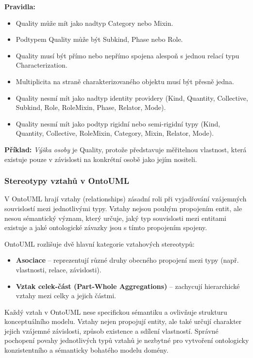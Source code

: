 \begin{itemize}
  \textbf{Pravidla:}
  \begin{itemize}
    \item Quality může mít jako nadtyp Category nebo Mixin.
    \item Podtypem Quality může být Subkind, Phase nebo Role.
    \item Quality musí být přímo nebo nepřímo spojena alespoň s jednou relací typu Characterization.
    \item Multiplicita na straně charakterizovaného objektu musí být přesně jedna.
    \item Quality nesmí mít jako nadtyp identity providery (Kind, Quantity, Collective, Subkind, Role, RoleMixin, Phase, Relator, Mode).
    \item Quality nesmí mít jako podtyp rigidní nebo semi-rigidní typy (Kind, Quantity, Collective, RoleMixin, Category, Mixin, Relator, Mode). \cite{ontouml_class_stereotypes}
  \end{itemize}

  \textbf{Příklad:} \textit{Výška osoby} je Quality, protože představuje měřitelnou vlastnost, která existuje pouze v závislosti na konkrétní osobě jako jejím nositeli.

\end{itemize}


\subsubsection{Stereotypy vztahů v OntoUML}
\label{sec:ontouml-vztahy}
V OntoUML hrají vztahy (relationships) zásadní roli při vyjadřování vzájemných souvislostí mezi jednotlivými typy. Vztahy nejsou pouhým propojením entit, ale nesou sémantický význam, který určuje, jaký typ souvislosti mezi entitami existuje a jaké ontologické závazky jsou s tímto propojením spojeny.

OntoUML rozlišuje dvě hlavní kategorie vztahových stereotypů:
\begin{itemize}
    \item \textbf{Asociace} – reprezentují různé druhy obecného propojení mezi typy (např. vlastnosti, relace, závislosti).
    \item \textbf{Vztak celek-část (Part-Whole Aggregations)} – zachycují hierarchické vztahy mezi celky a jejich částmi. \cite{ontouml_relations}
\end{itemize}

\noindent Každý vztah v OntoUML nese specifickou sémantiku a ovlivňuje strukturu konceptuálního modelu. Vztahy nejen propojují entity, ale také určují charakter jejich vzájemné závislosti, způsob existence a sdílení vlastností. Správné pochopení povahy jednotlivých typů vztahů je nezbytné pro vytvoření ontologicky konzistentního a sémanticky bohatého modelu domény.

